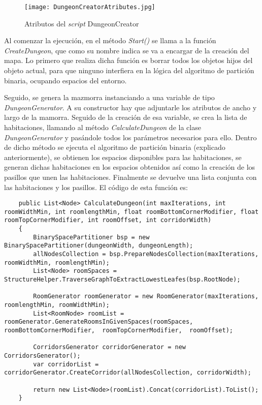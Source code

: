 \begin{figure}[H]
    \centering
    \texttt{[image: DungeonCreatorAtributes.jpg]}
    \caption{Atributos del \textit{script} DungeonCreator}
\end{figure}

Al comenzar la ejecución, en el método \textit{Start()} se llama a la función \textit{CreateDungeon}, que como su nombre indica se va a encargar de la creación del mapa. Lo primero que realiza dicha función es borrar todos los objetos hijos del objeto actual, para que ninguno interfiera en la lógica del algoritmo de partición binaria, ocupando espacios del entorno. 

Seguido, se genera la mazmorra instanciando a una variable de tipo \textit{DungeonGenerator}. A su constructor hay que adjuntarle los atributos de ancho y largo de la mamorra. Seguido de la creación de esa variable, se crea la lista de habitaciones, llamando al método \textit{CalculateDungeon} de la clase \textit{DungeonGenerator} y pasándole todos los parámetros necesarios para ello. Dentro de dicho método se ejecuta el algoritmo de partición binaria (explicado anteriormente), se obtienen los espacios disponibles para las habitaciones, se generan dichas habitaciones en los espacios obtenidos así como la creación de los pasillos que unen las habitaciones. Finalmente se devuelve una lista conjunta con las habitaciones y los pasillos. El código de esta función es:

\begin{lstlisting}
    public List<Node> CalculateDungeon(int maxIterations, int roomWidthMin, int roomlengthMin, float roomBottomCornerModifier, float roomTopCornerModifier, int roomOffset, int corridorWidth)
    {
        BinarySpacePartitioner bsp = new BinarySpacePartitioner(dungeonWidth, dungeonLength);
        allNodesCollection = bsp.PrepareNodesCollection(maxIterations, roomWidthMin, roomlengthMin);
        List<Node> roomSpaces = StructureHelper.TraverseGraphToExtractLowestLeafes(bsp.RootNode);

        RoomGenerator roomGenerator = new RoomGenerator(maxIterations, roomlengthMin, roomWidthMin);
        List<RoomNode> roomList = roomGenerator.GenerateRoomsInGivenSpaces(roomSpaces,  roomBottomCornerModifier,  roomTopCornerModifier,  roomOffset);

        CorridorsGenerator corridorGenerator = new CorridorsGenerator();
        var corridorList = corridorGenerator.CreateCorridor(allNodesCollection, corridorWidth);

        return new List<Node>(roomList).Concat(corridorList).ToList();
    }
\end{lstlisting}

